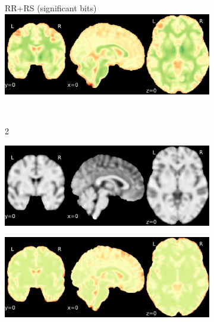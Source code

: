 \documentclass{article}
\begin{document}
\begin{appendices}
\begin{landscape}
\begin{figure}
\begin{subfigure}[t]{0.2\paperheight}
            \end{subfigure}
            \begin{subfigure}[t]{0.2\paperheight}
                \centering
                RR+RS (significant bits)
                \includegraphics[width=\textwidth]{figures/sig/5mm/rs_ds001600_sub-1_sig.pdf}
            \end{subfigure} \\
            \begin{subfigure}[b][][c]{0.01\paperwidth} 2 \vspace*{15pt} \end{subfigure}
            \begin{subfigure}[t]{0.2\paperheight}
                \centering
                \includegraphics[width=\textwidth]{figures/sig/5mm/ieee_ds001771_sub-36.pdf}
            \end{subfigure}
            \begin{subfigure}[t]{0.2\paperheight}
                \centering
                \includegraphics[width=\textwidth]{figures/sig/5mm/rr_ds001771_sub-36_sig.pdf}

\end{subfigure}
\end{figure}
\end{landscape}
\end{appendices}
\end{document}
